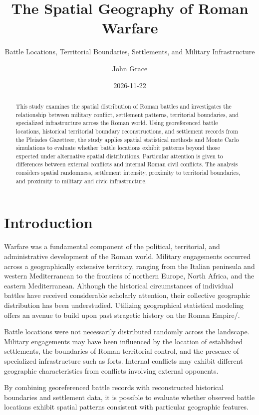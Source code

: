 \documentclass[
  letterpaper,
  DIV=11,
  numbers=noendperiod]{scrartcl}
\title{The Spatial Geography of Roman Warfare}
\subtitle{Battle Locations, Territorial Boundaries, Settlements, and
Military Infrastructure}
\author{John Grace}
\date{2026-11-22}
\begin{document}
\maketitle
\begin{abstract}
This study examines the spatial distribution of Roman battles and
investigates the relationship between military conflict, settlement
patterns, territorial boundaries, and specialized infrastructure across
the Roman world. Using georeferenced battle locations, historical
territorial boundary reconstructions, and settlement records from the
Pleiades Gazetteer, the study applies spatial statistical methods and
Monte Carlo simulations to evaluate whether battle locations exhibit
patterns beyond those expected under alternative spatial distributions.
Particular attention is given to differences between external conflicts
and internal Roman civil conflicts. The analysis considers spatial
randomness, settlement intensity, proximity to territorial boundaries,
and proximity to military and civic infrastructure.
\end{abstract}


\section{Introduction}\label{introduction}

Warfare was a fundamental component of the political, territorial, and
administrative development of the Roman world. Military engagements
occurred across a geographically extensive territory, ranging from the
Italian peninsula and western Mediterranean to the frontiers of northern
Europe, North Africa, and the eastern Mediterranean. Although the
historical circumstances of individual battles have received
considerable scholarly attention, their collective geographic
distribution has been understudied. Utilizing geographical statistical
modeling offers an avenue to build upon past stragetic history on the
Roman Empire/.

Battle locations were not necessarily distributed randomly across the
landscape. Military engagements may have been influenced by the location
of established settlements, the boundaries of Roman territorial control,
and the presence of specialized infrastructure such as forts. Internal
conflicts may exhibit different geographic characteristics from
conflicts involving external opponents.

By combining georeferenced battle records with reconstructed historical
boundaries and settlement data, it is possible to evaluate whether
observed battle locations exhibit spatial patterns consistent with
particular geographic features.
\end{document}

